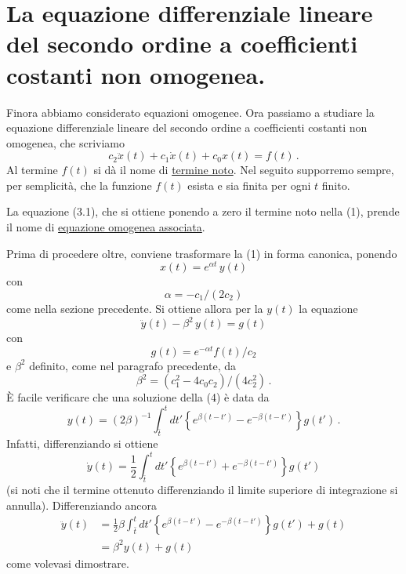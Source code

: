 \documentclass[11pt, a4paper]{book}
\numberwithin{equation}{section}
\begin{document}
\section[edo secondo ordine lineare a coeff. costanti non omogenea]{La equazione differenziale lineare del secondo ordine a coefficienti costanti non omogenea.}

Finora abbiamo considerato equazioni omogenee. Ora passiamo a studiare la
equazione differenziale lineare del secondo ordine a coefficienti costanti non
omogenea, che scriviamo
\begin{equation}
    c_2 \ddot{x}(t) + c_1 \dot{x}(t) + c_0 x(t) = f(t) \,.
\end{equation}
Al termine $f(t)$ si dà il nome di \uline{termine noto}. Nel seguito supporremo
sempre, per semplicità, che la funzione $f(t)$ esista e sia finita per ogni $t$ finito.

La equazione (3.1), che si ottiene ponendo a zero il termine noto nella (1),
prende il nome di \uline{equazione omogenea associata}.

Prima di procedere oltre, conviene trasformare la (1) in forma canonica,
ponendo
\begin{equation}
    x(t) = e^{\alpha t} \, y(t)
\end{equation}
con
\begin{equation}
    \alpha = -c_1 / (2 c_2)
\end{equation}
come nella sezione precedente. Si ottiene allora per la $y(t)$ la equazione
\begin{equation}
    \ddot{y}(t) - \beta^2 \, y(t) = g(t)
\end{equation}
con
\begin{equation}
    g(t) = e^{-\alpha t} f(t) / c_2
\end{equation}
e $\beta^2$ definito, come nel paragrafo precedente, da
\begin{equation}
    \beta^2 = (c_1^2 - 4 c_0 c_2) / (4 c_2^2) \,.
\end{equation}
È facile verificare che una soluzione della (4) è data da
\begin{equation}
    y(t) = (2\beta)^{-1} \int_{\bar{t}}^{t} dt' \left\{ e^{\beta(t-t')} - e^{-\beta(t-t')} \right\} g(t') \,.
\end{equation}
Infatti, differenziando si ottiene
\begin{equation}
    \dot{y}(t) = \frac{1}{2} \int_{\bar{t}}^{t} dt' \left\{ e^{\beta(t-t')} + e^{-\beta(t-t')} \right\} g(t')
\end{equation}
(si noti che il termine ottenuto differenziando il limite superiore di integrazione
si annulla). Differenziando ancora
\begin{align}
    \ddot{y}(t) &= \frac{1}{2} \beta \int_{\bar{t}}^{t} dt' \left\{ e^{\beta(t-t')} - e^{-\beta(t-t')} \right\} g(t') + g(t) \tag{9a} \\
    &= \beta^2 y(t) + g(t) \tag{9b}
\end{align}
come volevasi dimostrare.
\end{document}
